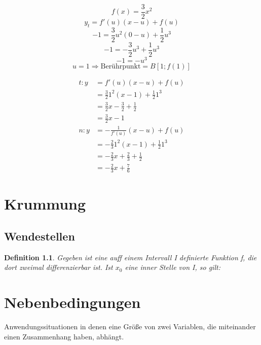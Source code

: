 \documentclass{scrbook}
\newtheorem{definition}{Definition}
\begin{document}
\[f(x) = \frac32 x^2\]
\[y_t = f'(u)(x-u) + f(u)\]
\[-1 = \frac32 u^2(0-u)+\frac12 u^3\]
\[-1 = -\frac32 u^3+\frac12 u^3\]
\[-1 = -u^3\]
\[u = 1 \Rightarrow \text{Berührpunkt} = B[1;f(1)]\]

\begin{equation*}
\begin{aligned}
t: y &= f'(u)(x-u)+f(u)
\\
&=\frac32 1^2(x-1)+\frac12 1^3
\\
&=\frac32 x - \frac 32 + \frac12
\\
&=\frac32 x -1
\\
n: y &= -\frac1{f'(u)}(x-u)+f(u)
\\
&=-\frac23 1^2(x-1) +\frac12 1^3
\\
& = -\frac23 x +\frac23 + \frac12
\\
&= -\frac23 x + \frac 76
\end{aligned}
\end{equation*}   



\chapter{Krummung}

\section{Wendestellen}

\begin{definition}
Gegeben ist eine auff einem Intervall I definierte Funktion f, die dort zweimal differenzierbar ist. Ist $x_0$ eine inner Stelle von I, so gilt:

\end{definition}

\chapter{Nebenbedingungen}

Anwendungssituationen in denen eine Größe von zwei Variablen, die miteinander einen Zusammenhang haben, abhängt.
\end{document}
